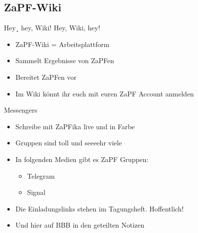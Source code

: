 \documentclass[compress,]{beamer}
\begin{document}

\subsection{ZaPF-Wiki}

\begin{frame}{Hey¸ hey, Wiki! Hey, Wiki, hey!}

\begin{itemize}[<+->]
	\item ZaPF-Wiki = Arbeitsplattform
	\item Sammelt Ergebnisse von ZaPFen
	\item Bereitet ZaPFen vor
	\item Im Wiki könnt ihr euch mit euren ZaPF Account anmelden
\end{itemize}

\end{frame}







\begin{frame}{Messengers}

\begin{itemize}[<+->]
	\item Schreibe mit ZaPFika live und in Farbe
	\item Gruppen sind toll und seeeehr viele
	\item In folgenden Medien gibt es ZaPF Gruppen:
		\begin{itemize}
			\item Telegram
			\item Signal
		\end{itemize}
	\item Die Einladungslinks stehen im Tagungsheft. Hoffentlich!
	\item Und hier auf BBB in den geteilten Notizen
\end{itemize}

\end{frame}
\end{document}

